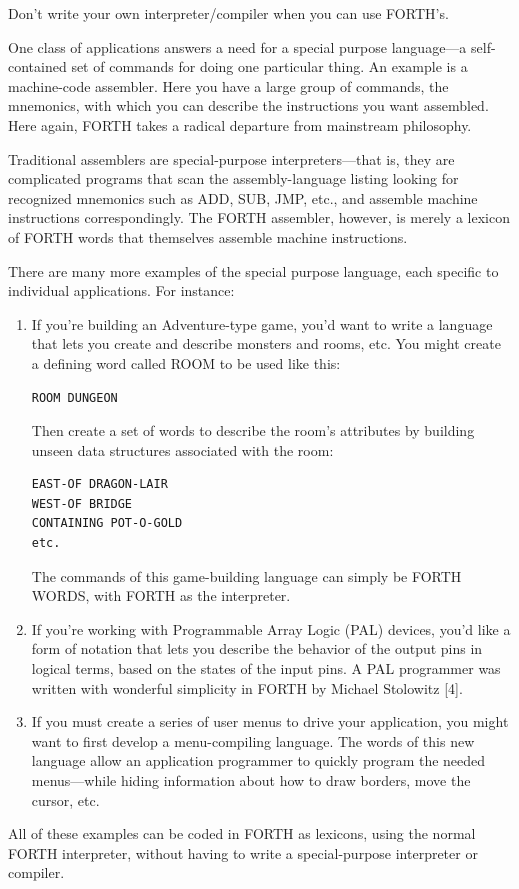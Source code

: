 \begin{tip}
Don't write your own interpreter/compiler when you can use FORTH's.
\end{tip}
One class of applications answers a need for a special purpose
language---a self-contained set of commands for doing one particular
thing. An example is a machine-code assembler. Here you have a large
group of commands, the mnemonics, with which you can describe the
instructions you want assembled. Here again, FORTH takes a radical
departure from mainstream philosophy.

Traditional assemblers are special-purpose interpreters---that is,
they are complicated programs that scan the assembly-language listing
looking for recognized mnemonics such as ADD, SUB, JMP, etc., and
assemble machine instructions correspondingly. The FORTH assembler,
however, is merely a lexicon of FORTH words that themselves assemble
machine instructions.

There are many more examples of the special purpose language,
each specific to individual applications. For instance:

\begin{enumerate}
\item If you're building an Adventure-type game, you'd want to write a language
that lets you create and describe monsters and rooms, etc. You might
create a defining word called ROOM to be used like this:

\begin{verbatim}
ROOM DUNGEON
\end{verbatim}

Then create a set of words to describe the room's attributes by building
unseen data structures associated with the room:

\begin{verbatim}
EAST-OF DRAGON-LAIR
WEST-OF BRIDGE
CONTAINING POT-O-GOLD
etc.
\end{verbatim}

The commands of this game-building language can simply be FORTH
WORDS, with FORTH as the interpreter.

\item If you're working with Programmable Array Logic (PAL) devices, you'd
like a form of notation that lets you describe the behavior of the output pins
in logical terms, based on the states of the input pins. A PAL programmer
was written with wonderful simplicity in FORTH by Michael Stolowitz [4].

\item If you must create a series of user menus to drive your application, you
might want to first develop a menu-compiling language. The words of this
new language allow an application programmer to quickly program the
needed menus---while hiding information about how to draw borders, move
the cursor, etc.
\end{enumerate}
All of these examples can be coded in FORTH as lexicons, using the normal
FORTH interpreter, without having to write a special-purpose interpreter
or compiler.

